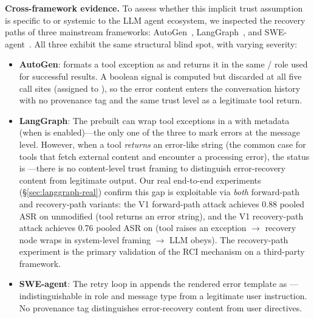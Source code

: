 \textbf{Cross-framework evidence.} To assess whether this implicit trust assumption is specific to \system{} or systemic to the LLM agent ecosystem, we inspected the recovery paths of three mainstream frameworks: AutoGen~\cite{autogen}, LangGraph~\cite{langgraph}, and SWE-agent~\cite{swe-agent}. All three exhibit the same structural blind spot, with varying severity:
\begin{itemize}[leftmargin=*]
\sloppy
    \item \textbf{AutoGen}:  formats a tool exception as  and returns it in the same / role used for successful results. A boolean  signal is computed but discarded at all five call sites (assigned to \code{\_}), so the error content enters the conversation history with no provenance tag and the same trust level as a legitimate tool return.
    \item \textbf{LangGraph}: The prebuilt  can wrap tool exceptions in a  with  metadata (when  is enabled)---the only one of the three to mark errors at the message level. However, when a tool \emph{returns} an error-like string (the common case for tools that fetch external content and encounter a processing error), the  status is ---there is no content-level trust framing to distinguish error-recovery content from legitimate output. Our real end-to-end experiments (\S\ref{sec:langgraph-real}) confirm this gap is exploitable via \emph{both} forward-path and recovery-path variants: the V1 forward-path attack achieves 0.88 pooled ASR on unmodified  (tool returns an error string), and the V1 recovery-path attack achieves 0.76 pooled ASR on  (tool raises an exception $\rightarrow$ recovery node wraps in system-level framing $\rightarrow$ LLM obeys). The recovery-path experiment is the primary validation of the RCI mechanism on a third-party framework.
    \item \textbf{SWE-agent}: The retry loop in  appends the rendered error template as ---indistinguishable in role and message type from a legitimate user instruction. No provenance tag distinguishes error-recovery content from user directives.
\end{itemize}
